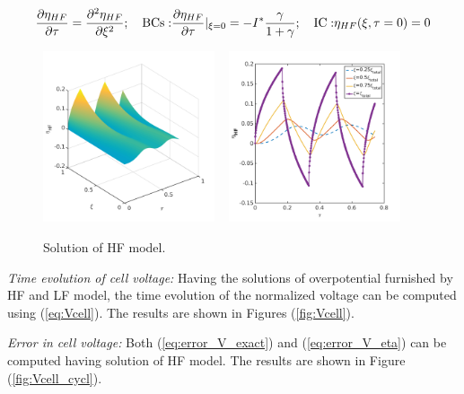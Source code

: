 \documentclass[]{article}
\begin{document}
\begin{equation*}
\frac{\partial\eta_{HF}}{\partial\tau} = \frac{\partial^2\eta_{HF}}{\partial\xi^2}; \quad
{\rm BCs:}  \frac{\partial\eta_{HF}}{\partial\tau}|_{\xi=0} = -I^* \frac{\gamma}{1+\gamma}; \quad 
{\rm IC:}  \eta_{HF}(\xi,\tau=0)=0
\end{equation*}
%
\begin{figure}[h]
    \centering
    \includegraphics[trim = 0in 0in 0in 0in, clip, width=0.45\textwidth]{figures/cyclic_new/etaHF3d.png}
    ~
    \includegraphics[trim = 0in 0in 0in 0in, clip, width=0.45\textwidth]{figures/cyclic_new/etaHF_t.png}  
    \vspace{-0.2in}    
    \caption{Solution of HF model.}
    \label{fig:etaHF_cycl}
\end{figure}

%
\noindent\textit{Time evolution of cell voltage:}
Having the solutions of overpotential furnished by HF and LF model, the time evolution of the normalized voltage can be computed using (\ref{eq:Vcell}). The results are shown in Figures (\ref{fig:Vcell}).


\vspace{0.1in}
\noindent\textit{Error in cell voltage:}
Both (\ref{eq:error_V_exact}) and (\ref{eq:error_V_eta}) can be computed having solution of HF model. The results are shown in Figure (\ref{fig:Vcell_cycl}).
\end{document}
